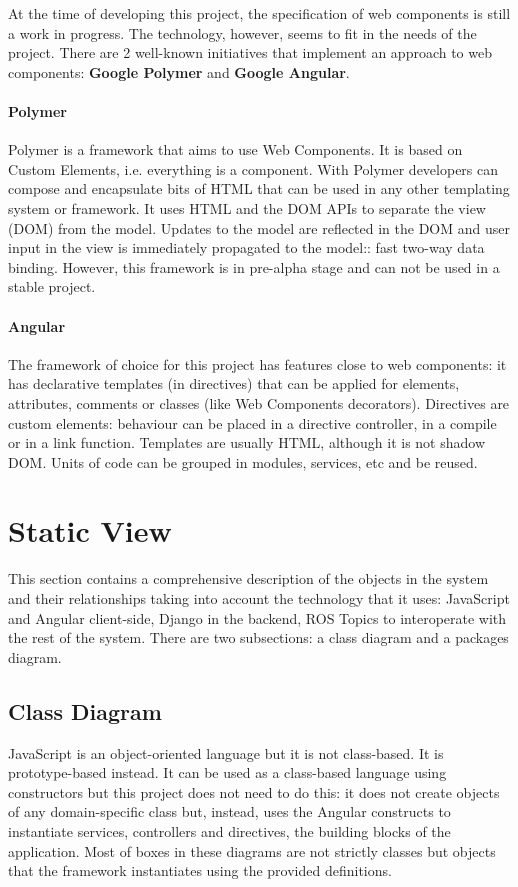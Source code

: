At the time of developing this project, the specification of web components is still a work in progress.
The technology, however, seems to fit in the needs of the project.
There are 2 well-known initiatives that implement an approach to web components: \textbf{Google Polymer} and \textbf{Google Angular}.

\paragraph{Polymer} Polymer is a framework that aims to use Web Components. 
It is based on Custom Elements, i.e. everything is a component.
With Polymer developers can compose and encapsulate bits of HTML that can be used in any other templating system or framework.
It uses \ac{HTML} and the \ac{DOM} \acp{API} to separate the view (\ac{DOM}) from the model. 
Updates to the model are reflected in the \ac{DOM} and user input in the view is immediately propagated to the model:: fast two-way data binding.
However, this framework is in pre-alpha stage and can not be used in a stable project.

\paragraph{Angular} The framework of choice for this project has features close to web components: it has declarative templates (in directives) that can be applied for elements, attributes, comments or classes (like Web Components decorators).
Directives are custom elements: behaviour can be placed in a directive controller, in a compile or in a link function.
Templates are usually \ac{HTML}, although it is not shadow \ac{DOM}.
Units of code can be grouped in modules, services, etc and be reused.

\FloatBarrier

\section{Static View}
This section contains a comprehensive description of the objects in the system and their relationships taking into account the technology that it uses: JavaScript and Angular client-side, Django in the backend, \ac{ROS} Topics to interoperate with the rest of the system.
There are two subsections: a class diagram and a packages diagram.

\subsection{Class Diagram}
JavaScript is an object-oriented language but it is not class-based.
It is prototype-based instead.
It can be used as a class-based language using constructors but this project does not need to do this: it does not create objects of any domain-specific class but, instead, uses the Angular constructs to instantiate services, controllers and directives, the building blocks of the application.
Most of boxes in these diagrams are not strictly classes but objects that the framework instantiates using the provided definitions.

